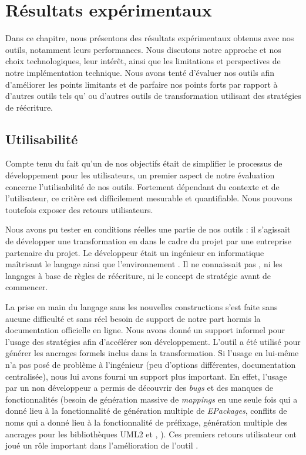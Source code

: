 \chapter{Résultats expérimentaux}
\label{ch:evaluation}

Dans ce chapitre, nous présentons des résultats expérimentaux obtenus avec nos
outils, notamment leurs performances. Nous discutons notre approche et nos
choix technologiques, leur intérêt, ainsi que les limitations et perspectives de
notre implémentation technique.
Nous avons tenté d'évaluer nos outils afin d'améliorer les points limitants et
de parfaire nos points forts par rapport à d'autres outils tels qu'{\atl} ou
d'autres outils de transformation utilisant des stratégies de réécriture.


\section{Utilisabilité}


Compte tenu du fait qu'un de nos objectifs était de simplifier le processus de
développement pour les utilisateurs, un premier aspect de notre évaluation
concerne l'utilisabilité de nos outils. 
Fortement dépendant du contexte et de l'utilisateur, ce critère est
difficilement mesurable et quantifiable. Nous pouvons toutefois exposer des
retours utilisateurs.
 
Nous avons pu tester en conditions réelles une partie de nos outils : il
s'agissait de développer une transformation en {\tomjava} dans le cadre du
projet {\quarteft} par une entreprise partenaire du projet. Le développeur
était un ingénieur en informatique maîtrisant le langage {\java} ainsi que
l'environnement {\eclipse}. Il ne connaissait pas {\tom}, ni les langages à
base de règles de réécriture, ni le concept de stratégie avant de commencer.

La prise en main du langage {\tom} sans les nouvelles constructions s'est faite
sans aucune difficulté et sans réel besoin de support de notre part hormis la
documentation officielle en ligne. Nous avons donné un support informel pour
l'usage des stratégies {\tom} afin d'accélérer son développement. L'outil
{\tomemf} a été utilisé pour générer les ancrages formels inclus dans la
transformation. Si l'usage en lui-même n'a pas posé de problème à l'ingénieur
(peu d'options différentes, documentation centralisée), nous lui avons fourni
un support plus important. En effet, l'usage par un non développeur a permis de
découvrir des \emph{bugs} et des manques de fonctionnalités (besoin de
génération massive de \emph{mappings} en une seule fois qui a donné lieu à la
fonctionnalité de génération multiple de \emph{EPackages}, conflits de noms
qui a donné lieu à la fonctionnalité de préfixage, génération multiple des
ancrages pour les bibliothèques UML2 et {\ecore}, {\etc}). Ces premiers retours
utilisateur ont joué un rôle important dans l'amélioration de l'outil
{\tomemf}.

